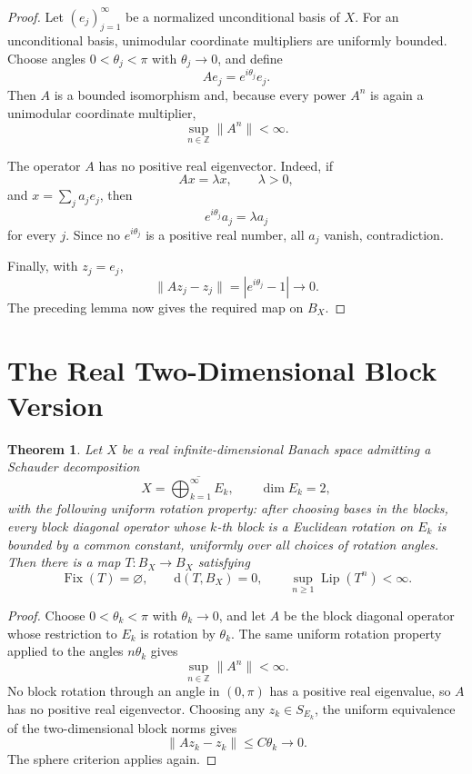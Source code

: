 \documentclass[11pt]{article}
\newtheorem{theorem}{Theorem}
\newcommand{\Fix}{\operatorname{Fix}}
\newcommand{\Lip}{\operatorname{Lip}}
\begin{document}
\begin{proof}
Let \((e_j)_{j=1}^\infty\) be a normalized unconditional basis of \(X\).
For an unconditional basis, unimodular coordinate multipliers are uniformly
bounded.  Choose angles \(0<\theta_j<\pi\) with \(\theta_j\to0\), and define
\[
A e_j=e^{i\theta_j}e_j .
\]
Then \(A\) is a bounded isomorphism and, because every power \(A^n\) is again
a unimodular coordinate multiplier,
\[
\sup_{n\in\mathbb Z}\|A^n\|<\infty .
\]

The operator \(A\) has no positive real eigenvector.  Indeed, if
\[
Ax=\lambda x,\qquad \lambda>0,
\]
and \(x=\sum_j a_j e_j\), then
\[
e^{i\theta_j}a_j=\lambda a_j
\]
for every \(j\).  Since no \(e^{i\theta_j}\) is a positive real number, all
\(a_j\) vanish, contradiction.

Finally, with \(z_j=e_j\),
\[
\|Az_j-z_j\|=|e^{i\theta_j}-1|\to0.
\]
The preceding lemma now gives the required map on \(B_X\).
\end{proof}

\section*{The Real Two-Dimensional Block Version}

\begin{theorem}
Let \(X\) be a real infinite-dimensional Banach space admitting a Schauder
decomposition
\[
X=\overline{\bigoplus_{k=1}^{\infty}E_k},\qquad \dim E_k=2,
\]
with the following uniform rotation property: after choosing bases in the
blocks, every block diagonal operator whose \(k\)-th block is a Euclidean
rotation on \(E_k\) is bounded by a common constant, uniformly over all
choices of rotation angles.  Then there is a map \(T:B_X\to B_X\) satisfying
\[
\Fix(T)=\varnothing,\qquad
\mathrm d(T,B_X)=0,\qquad
\sup_{n\ge1}\Lip(T^n)<\infty .
\]
\end{theorem}

\begin{proof}
Choose \(0<\theta_k<\pi\) with \(\theta_k\to0\), and let \(A\) be the block
diagonal operator whose restriction to \(E_k\) is rotation by \(\theta_k\).
The same uniform rotation property applied to the angles \(n\theta_k\) gives
\[
\sup_{n\in\mathbb Z}\|A^n\|<\infty .
\]
No block rotation through an angle in \((0,\pi)\) has a positive real
eigenvalue, so \(A\) has no positive real eigenvector.  Choosing any
\(z_k\in S_{E_k}\), the uniform equivalence of the two-dimensional block
norms gives
\[
\|Az_k-z_k\|\le C\theta_k\to0.
\]
The sphere criterion applies again.
\end{proof}
\end{document}
